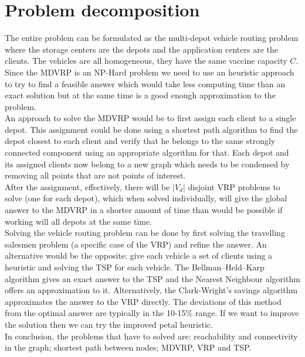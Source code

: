 \documentclass{article}
\begin{document}
\section{Problem decomposition}
The entire problem can be formulated as the multi-depot vehicle routing problem where the storage centers are the depots and the application centers are the clients. The vehicles are all homogeneous, they have the same vaccine capacity $C$.\\
Since the MDVRP is an NP-Hard problem we need to use an heuristic approach to try to find a feasible answer which would take less computing time than an exact solution but at the same time is a good enough approximation to the problem.\\
An approach to solve the MDVRP would be to first assign each client to a single depot. This assignment could be done using a shortest path algorithm to find the depot closest to each client and verify that he belongs to the same strongly connected component using an appropriate algorithm for that. Each depot and its assigned clients now belong to a new graph which needs to be condensed by removing all points that are not points of interest. \\
After the assignment, effectively, there will be $|V_d|$ disjoint VRP problems to solve (one for each depot), which when solved individually, will give the global answer to the MDVRP in a shorter amount of time than would be possible if working will all depots at the same time.\\
Solving the vehicle routing problem can be done by first solving the travelling salesmen problem (a specific case of the VRP) and refine the answer. An alternative would be the opposite: give each vehicle a set of clients using a heuristic and solving the TSP for each vehicle. The Bellman–Held–Karp algorithm gives an exact answer to the TSP and the Nearest Neighbour algorithm offers an approximation to it. Alternatively, the Clark-Wright's savings algorithm approximates the answer to the VRP directly. The deviations of this method from the optimal answer are typically in the 10-15\% range. If we want to improve the solution then we can try the improved petal heuristic.\\
In conclusion, the problems that have to solved are: reachability and connectivity in the graph; shortest path between nodes; MDVRP, VRP and TSP.
\newpage
\end{document}
